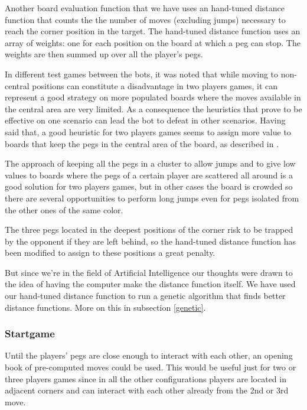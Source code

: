 \documentclass[a4paper,11pt]{article}
\begin{document}
Another board evaluation function that we have uses an hand-tuned
distance function that counts the the number of moves (excluding
jumps) necessary to reach the corner position in the target. The
hand-tuned distance function uses an array of weights: one for each
position on the board at which a peg can stop. The weights are then
summed up over all the player's pegs.

In different test games between the bots, it was noted that while moving to
non-central positions can constitute a disadvantage in two players games, it can
represent a good strategy on more populated boards where the moves available in
the central area are very limited. As a consequence the heuristics that prove to
be effective on one scenario can lead the bot to defeat in other scenarios.
Having said that, a good heuristic for two players games seems to assign more
value to boards that keep the pegs in the central area of the board, as
described in \cite{ulfhake}.

The approach of keeping all the pegs in a cluster to allow jumps and to give low
values to boards where the pegs of a certain player are scattered all around is
a good solution for two players games, but in other cases the board is crowded
so there are several opportunities to perform long jumps even for pegs isolated
from the other ones of the same color.

The three pegs located in the deepest positions of the corner risk to be trapped
by the opponent if they are left behind, so the hand-tuned distance function has
been modified to assign to these positions a great penalty.

But since we're in the field of Artificial Intelligence our thoughts
were drawn to the idea of having the computer make the distance
function itself. We have used our hand-tuned distance function to run
a genetic algorithm that finds better distance functions. More on this
in subsection \ref{genetic}.

\subsubsection{Startgame}
Until the players' pegs are close enough to interact with each other, an opening
book of pre-computed moves could be used. This would be useful just for two or
three players games since in all the other configurations players are located in
adjacent corners and can interact with each other already from the 2nd or 3rd
move.
\end{document}
